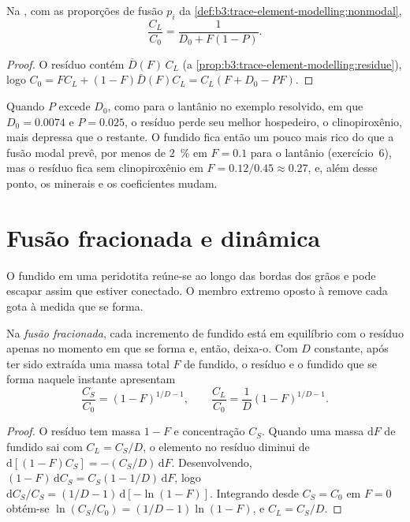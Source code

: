 \begin{proposition}\label{prop:b3:trace-element-modelling:nonmodal}
Na , com as proporções de fusão $p_i$ da \cref{def:b3:trace-element-modelling:nonmodal},
\[
\frac{C_L}{C_0} = \frac{1}{D_0 + F(1 - P)}.
\]
\end{proposition}

\begin{proof}
O resíduo contém $\bar D(F)\,C_L$ (a \cref{prop:b3:trace-element-modelling:residue}),
logo $C_0 = FC_L + (1 - F)\bar D(F)C_L = C_L(F + D_0 - PF)$.
\end{proof}

Quando $P$ excede $D_0$, como para o lantânio no exemplo resolvido, em que $D_0 =
0.0074$ e $P = 0.025$, o resíduo perde seu melhor hospedeiro, o clinopiroxênio, mais depressa que
o restante. O fundido fica então um pouco mais rico do que a fusão modal prevê,
por menos de \qty{2}{\percent} em $F = 0.1$ para o lantânio (exercício~6), mas o
resíduo fica sem clinopiroxênio em $F = 0.12/0.45 \approx 0.27$, e, além desse ponto,
os minerais e os coeficientes mudam.

\section{Fusão fracionada e dinâmica}\label{sec:b3:trace-element-modelling:fractional}

O fundido em uma peridotita reúne-se ao longo das bordas dos grãos e pode escapar assim que estiver
conectado. O membro extremo oposto à  remove cada gota à medida que
se forma.

\begin{theorem}\label{thm:b3:trace-element-modelling:fractional}
Na \emph{fusão fracionada}, cada incremento de fundido
está em equilíbrio com o resíduo apenas no momento em que se forma e, então, deixa-o.
Com $D$ constante, após ter sido extraída uma massa total $F$ de fundido, o
resíduo e o fundido que se forma naquele instante apresentam
\[
\frac{C_S}{C_0} = (1 - F)^{1/D - 1}, \qquad
\frac{C_L}{C_0} = \frac{1}{D}(1 - F)^{1/D - 1}.
\]
\end{theorem}

\begin{proof}
O resíduo tem massa $1 - F$ e concentração $C_S$. Quando uma massa
$\mathrm dF$ de fundido sai com $C_L = C_S/D$, o elemento no resíduo
diminui de $\mathrm d[(1 - F)C_S] = -(C_S/D)\,\mathrm dF$. Desenvolvendo,
$(1 - F)\,\mathrm dC_S = C_S(1 - 1/D)\,\mathrm dF$, logo
$\mathrm dC_S/C_S = (1/D - 1)\,\mathrm d[-\ln(1 - F)]$. Integrando desde
$C_S = C_0$ em $F = 0$ obtém-se $\ln(C_S/C_0) = (1/D - 1)\ln(1 - F)$, e
$C_L = C_S/D$.
\end{proof}

